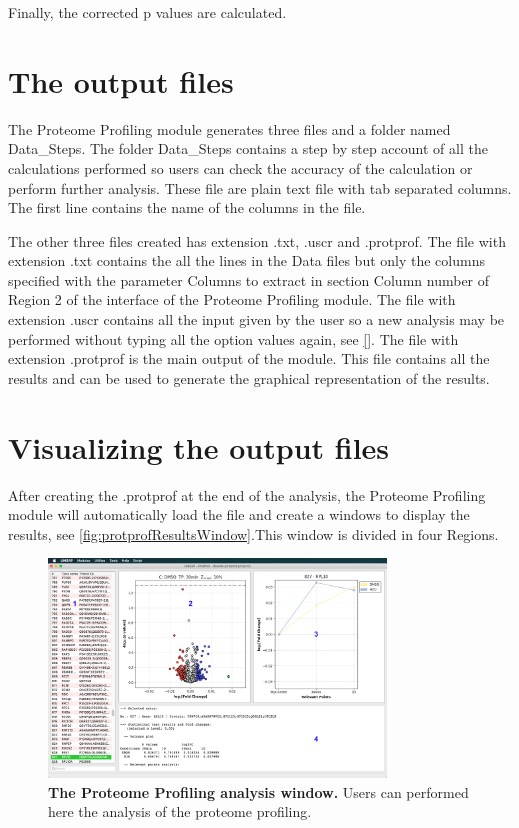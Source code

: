 Finally, the corrected p values are calculated.

\section{The output files}

The Proteome Profiling module generates three files and a folder named Data\_Steps. The folder Data\_Steps contains a step by step account of all the calculations performed so users can check the accuracy of the calculation or perform further analysis. These file are plain text file with tab separated columns. The first line contains the name of the columns in the file.  

The other three files created has extension .txt, .uscr and .protprof. The file with extension .txt contains the all the lines in the Data files but only the columns specified with the parameter Columns to extract in section Column number of Region \num{2} of the interface of the Proteome Profiling module. The file with extension .uscr contains all the input given by the user so a new analysis may be performed without typing all the option values again, see \autoref{}. The file with extension .protprof is the main output of the module. This file contains all the results and can be used to generate the graphical representation of the results.    

\section{Visualizing the output files}

After creating the .protprof at the end of the analysis, the Proteome Profiling module will automatically load the file and create a windows to display the results, see \autoref{fig:protprofResultsWindow}.This window is divided in four Regions. 

\begin{figure}[h]
	\centering
	\includegraphics[width=0.8\textwidth]{./IMAGES/MOD-PROTPROF/protprof-frag.jpg}	    
	\caption[The Proteome Profiling analysis window]{\textbf{The Proteome Profiling analysis window.} Users can performed here the analysis of the proteome profiling.} 
	\label{fig:protprofResultsWindow}
	\vspace{-5pt} 	
\end{figure}

